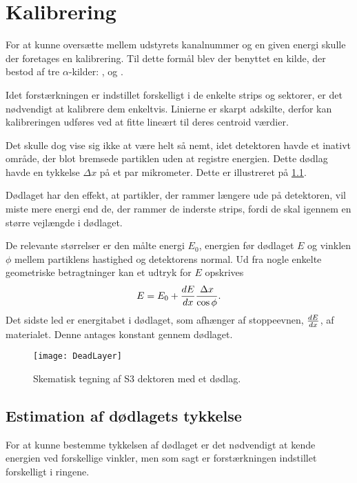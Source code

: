 \chapter{Kalibrering}
\label{cha:kalibrering}

For at kunne oversætte mellem udstyrets kanalnummer og en given energi skulle der foretages en
kalibrering. Til dette formål blev der benyttet en kilde, der bestod af tre $\alpha$-kilder:
,  og .

Idet forstærkningen er indstillet forskelligt i de enkelte strips og sektorer, er det
nødvendigt at kalibrere dem enkeltvis. Linierne er skarpt adskilte, derfor kan kalibreringen udføres
ved at fitte lineært til deres centroid værdier.  

Det skulle dog vise sig ikke at være helt så nemt, idet detektoren havde et inativt område, der blot
bremsede partiklen uden at registre energien. Dette dødlag havde en tykkelse $\Delta x$ på et par
mikrometer. Dette er illustreret på \ref{fig:deadLayer}.

Dødlaget har den effekt, at partikler, der rammer længere ude på detektoren, vil miste mere energi
end de, der rammer de inderste strips, fordi de skal igennem en større vejlængde i dødlaget.

De relevante størrelser er den målte energi $E_{0}$, energien før dødlaget $E$ og vinklen $\phi$ mellem
partiklens hastighed og detektorens normal. Ud fra nogle enkelte geometriske betragtninger kan et
udtryk for $E$ opskrives
\begin{equation}
  \label{eq:deadE}
  E = E_{0} + \frac{d E}{d x} \frac{\Delta x}{\cos \phi}  .
\end{equation}
Det sidste led er energitabet i dødlaget, som afhænger af stoppeevnen, $\frac{d E}{d x}$, af
materialet. Denne antages konstant gennem dødlaget. 
\begin{figure}[h]
  \centering
  \texttt{[image: DeadLayer]}
  \caption{Skematisk tegning af S3 dektoren med et dødlag.}
  \label{fig:deadLayer}
\end{figure}

\section{Estimation af dødlagets tykkelse}
\label{sec:dodlag}

For at kunne bestemme tykkelsen af dødlaget er det nødvendigt at kende energien ved forskellige
vinkler, men som sagt er forstærkningen indstillet forskelligt i ringene.

